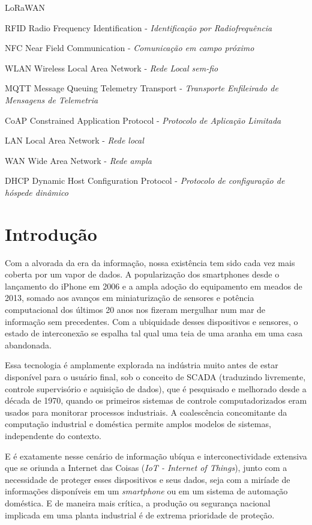 \documentclass[tcc,capa]{texufpel}
\begin{document}
\begin{listofabbrv}{LoRaWAN}
        \item[RFID] Radio Frequency Identification - \textit{Identificação por Radiofrequência}
        \item[NFC] Near Field Communication - \textit{Comunicação em campo próximo}
        \item[WLAN] Wireless Local Area Network - \textit{Rede Local sem-fio}
        \item[MQTT] Message Queuing Telemetry Transport - \textit{Transporte Enfileirado de Mensagens de Telemetria}
        \item[CoAP] Constrained Application Protocol - \textit{Protocolo de Aplicação Limitada}
        \item[LAN] Local Area Network - \textit{Rede local}
        \item[WAN] Wide Area Network - \textit{Rede ampla}
        \item[DHCP] Dynamic Host Configuration Protocol - \textit{Protocolo de configuração de hóspede dinâmico}     
\end{listofabbrv}

\tableofcontents

\chapter{Introdução}

Com a alvorada da era da informação, nossa existência tem sido cada vez mais coberta por um vapor de dados. A popularização dos smartphones desde o lançamento do iPhone em 2006 e a ampla adoção do equipamento em meados de 2013, somado aos avanços em miniaturização de sensores e potência computacional dos últimos 20 anos nos fizeram mergulhar num mar de informação sem precedentes. Com a ubiquidade desses dispositivos e sensores, o estado de interconexão se espalha tal qual uma teia de uma aranha em uma casa abandonada. 

Essa tecnologia é amplamente explorada na indústria muito antes de estar disponível para o usuário final, sob o conceito de SCADA (traduzindo livremente, controle supervisório e aquisição de dados), que é pesquisado e melhorado desde a década de 1970, quando os primeiros sistemas de controle computadorizados eram usados para monitorar processos industriais. A coalescência concomitante da computação industrial e doméstica permite amplos modelos de sistemas, independente do contexto.

E é exatamente nesse cenário de informação ubíqua e interconectividade extensiva que se oriunda a Internet das Coisas (\textit{IoT - Internet of Things}), junto com a necessidade de proteger esses dispositivos e seus dados, seja com a miríade de informações disponíveis em um \textit{smartphone} ou em um sistema de automação doméstica. E de maneira mais crítica, a produção ou segurança nacional implicada em uma planta industrial é de extrema prioridade de proteção. 
\end{document}
